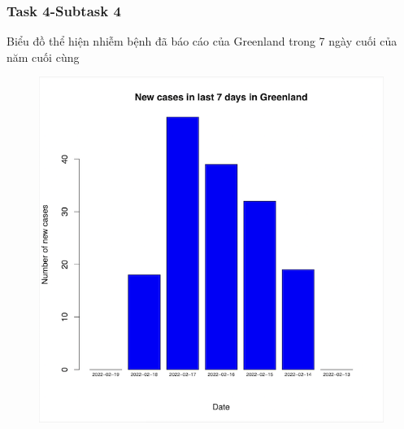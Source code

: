 \documentclass[english,10pt,table]{beamer}
\begin{document}
{
    \frametitle{Task 4-Subtask 4}
    \begin{block}{Biểu đồ thể hiện nhiễm bệnh đã báo cáo của Greenland trong 7 ngày cuối của năm cuối cùng}
    \begin{figure}[H]
		\centering
		\includegraphics[scale=0.6]{images/4.4.3.png}
	\end{figure}
    \end{block}
}
\end{document}
